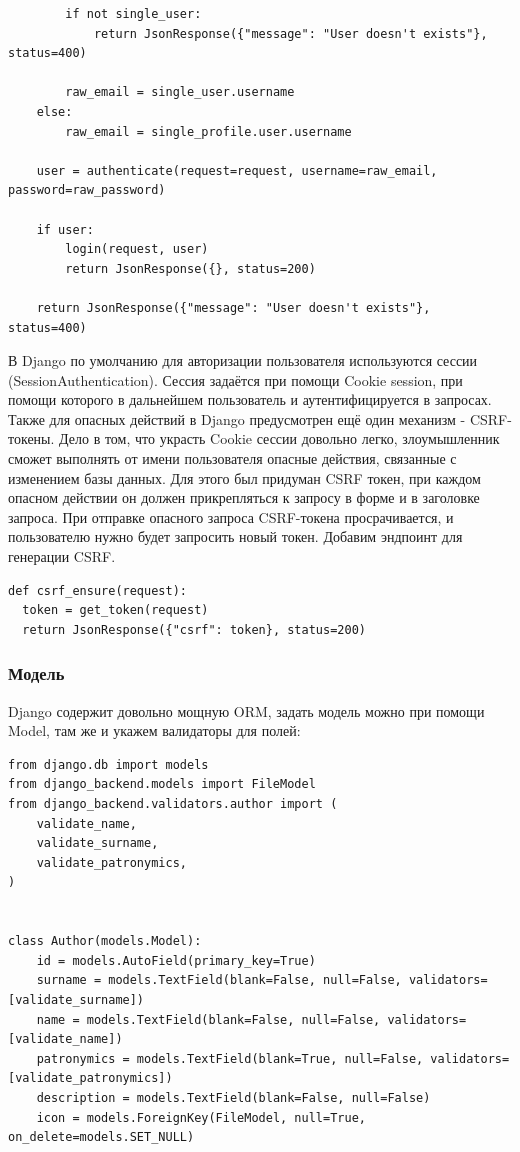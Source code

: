 \documentclass[a4paper,14pt]{extarticle}
\begin{document}
\begin{verbatim}
        if not single_user:
            return JsonResponse({"message": "User doesn't exists"}, status=400)

        raw_email = single_user.username
    else:
        raw_email = single_profile.user.username

    user = authenticate(request=request, username=raw_email, password=raw_password)

    if user:
        login(request, user)
        return JsonResponse({}, status=200)

    return JsonResponse({"message": "User doesn't exists"}, status=400) 

\end{verbatim}
 
В Django по умолчанию для авторизации пользователя используются сессии (SessionAuthentication). Сессия задаётся при помощи 
Cookie session, при помощи которого в дальнейшем пользователь и аутентифицируется в запросах. Также для опасных 
действий в Django предусмотрен ещё один механизм - CSRF-токены. Дело в том, что украсть Cookie сессии довольно легко, 
злоумышленник сможет выполнять от имени пользователя опасные действия, связанные с изменением базы данных. 
Для этого был придуман CSRF токен, при каждом опасном действии он должен прикрепляться к запросу в форме
и в заголовке запроса. При отправке опасного запроса CSRF-токена просрачивается, и пользователю нужно будет
запросить новый токен. Добавим эндпоинт для генерации CSRF.
\begin{verbatim}
def csrf_ensure(request):
  token = get_token(request)
  return JsonResponse({"csrf": token}, status=200)
\end{verbatim}

\subsubsection{Модель}
Django содержит довольно мощную ORM, задать модель можно при помощи Model, там же 
и укажем валидаторы для полей:
\begin{verbatim}
from django.db import models
from django_backend.models import FileModel
from django_backend.validators.author import (
    validate_name,
    validate_surname,
    validate_patronymics,
)


class Author(models.Model):
    id = models.AutoField(primary_key=True)
    surname = models.TextField(blank=False, null=False, validators=[validate_surname])
    name = models.TextField(blank=False, null=False, validators=[validate_name])
    patronymics = models.TextField(blank=True, null=False, validators=[validate_patronymics])
    description = models.TextField(blank=False, null=False)
    icon = models.ForeignKey(FileModel, null=True, on_delete=models.SET_NULL)
\end{verbatim}
\end{document}
